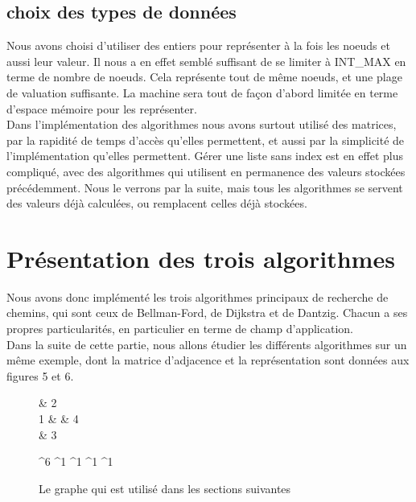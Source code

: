 \documentclass[a4paper,12pt,final] {article}
\begin{document}
\subsection{choix des types de données}

Nous avons choisi d'utiliser des entiers pour représenter à la fois les noeuds et aussi leur valeur. Il nous a en effet semblé suffisant de se limiter à INT\_MAX en terme de nombre de noeuds. Cela représente tout de même  noeuds, et une plage de valuation suffisante. La machine sera tout de façon d'abord limitée en terme d'espace mémoire pour les représenter.\\

Dans l'implémentation des algorithmes nous avons surtout utilisé des matrices, par la rapidité de temps d'accès qu'elles permettent, et aussi par la simplicité de l'implémentation qu'elles permettent. Gérer une liste sans index est en effet plus compliqué, avec des algorithmes qui utilisent en permanence des valeurs stockées précédemment. Nous le verrons par la suite, mais tous les algorithmes se servent des valeurs déjà calculées, ou remplacent celles déjà stockées.\\

\newpage
\section{Présentation des trois algorithmes}

Nous avons donc implémenté les trois algorithmes principaux de recherche de chemins, qui sont ceux de Bellman-Ford, de Dijkstra et de Dantzig. Chacun a ses propres particularités, en particulier en terme de champ d'application.\\

Dans la suite de cette partie, nous allons étudier les différents algorithmes sur un même exemple, dont la matrice d'adjacence et la représentation sont données aux figures 5 et 6.\\ %

\begin{figure}[htpd]
 \centering
 \begin{psmatrix}[mnode=circle]
	    & 2\\
	 1 &    & 4\\
	    & 3\\
\end{psmatrix}
	
	^{6}
	^{1}
	^{1}
	^{1}
	^{1}

  \caption{Le graphe qui est utilisé dans les sections suivantes}
\end{figure}
\end{document}
